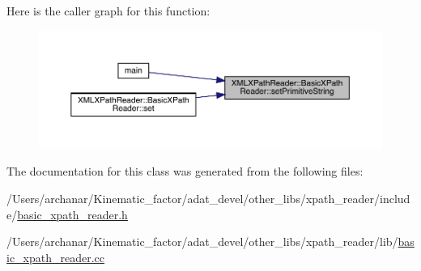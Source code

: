Here is the caller graph for this function\+:\nopagebreak
\begin{figure}[H]
\begin{center}
\leavevmode
\includegraphics[width=350pt]{d6/dbf/classXMLXPathReader_1_1BasicXPathReader_a1cc6aa3e855c995ebd874c475a68a076_icgraph}
\end{center}
\end{figure}


The documentation for this class was generated from the following files\+:\begin{DoxyCompactItemize}
\item 
/\+Users/archanar/\+Kinematic\+\_\+factor/adat\+\_\+devel/other\+\_\+libs/xpath\+\_\+reader/include/\mbox{\hyperlink{other__libs_2xpath__reader_2include_2basic__xpath__reader_8h}{basic\+\_\+xpath\+\_\+reader.\+h}}\item 
/\+Users/archanar/\+Kinematic\+\_\+factor/adat\+\_\+devel/other\+\_\+libs/xpath\+\_\+reader/lib/\mbox{\hyperlink{basic__xpath__reader_8cc}{basic\+\_\+xpath\+\_\+reader.\+cc}}\end{DoxyCompactItemize}
